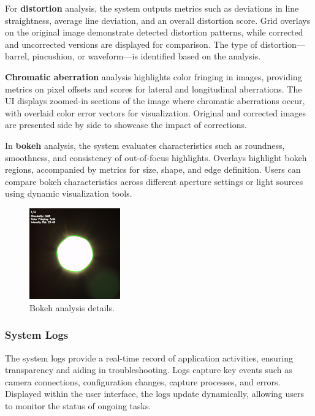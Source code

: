 For \textbf{distortion} analysis, the system outputs metrics such as deviations in line straightness, average line deviation, and an overall distortion score. Grid overlays on the original image demonstrate detected distortion patterns, while corrected and uncorrected versions are displayed for comparison. The type of distortion—barrel, pincushion, or waveform—is identified based on the analysis.

\textbf{Chromatic aberration} analysis highlights color fringing in images, providing metrics on pixel offsets and scores for lateral and longitudinal aberrations. The UI displays zoomed-in sections of the image where chromatic aberrations occur, with overlaid color error vectors for visualization. Original and corrected images are presented side by side to showcase the impact of corrections.

In \textbf{bokeh} analysis, the system evaluates characteristics such as roundness, smoothness, and consistency of out-of-focus highlights. Overlays highlight bokeh regions, accompanied by metrics for size, shape, and edge definition. Users can compare bokeh characteristics across different aperture settings or light sources using dynamic visualization tools.

\begin{figure}[h]
\centering
\includegraphics[width=0.35\textwidth]{Images/bokeh_image_result.jpg}
\caption{Bokeh analysis details.}
\label{fig:ui_bokeh_image}
\end{figure}

\subsubsection{System Logs}
The system logs provide a real-time record of application activities, ensuring transparency and aiding in troubleshooting. Logs capture key events such as camera connections, configuration changes, capture processes, and errors. Displayed within the user interface, the logs update dynamically, allowing users to monitor the status of ongoing tasks.

